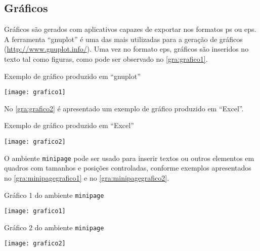 \subsection{Gráficos}\label{sec:graficos}

Gráficos são gerados com aplicativos capazes de exportar nos formatos \gls{ps} ou \gls{eps}. A ferramenta ``gnuplot'' é uma das mais utilizadas para a geração de gráficos (\url{http://www.gnuplot.info/}). Uma vez no formato \gls{eps}, gráficos são inseridos no texto tal como figuras, como pode ser observado no \autoref{gra:grafico1}.

\begin{graph}[htb]%
\caption{Exemplo de gráfico produzido em ``gnuplot''}%
\label{gra:grafico1}%
\texttt{[image: grafico1]}%
\end{graph}

No \autoref{gra:grafico2} é apresentado um exemplo de gráfico produzido em ``Excel''.

\begin{graph}[htb]%
\caption{Exemplo de gráfico produzido em ``Excel''}%
\label{gra:grafico2}%
\texttt{[image: grafico2]}%
\end{graph}

O ambiente \texttt{minipage} pode ser usado para inserir textos ou outros elementos em quadros com tamanhos e posições controladas, conforme exemplos apresentados no \autoref{gra:minipagegrafico1} e no \autoref{gra:minipagegrafico2}.

\begin{graph}[htb]%
\begin{minipage}[t]{0.395\textwidth}%
\centering%
\caption{Gráfico 1 do ambiente \texttt{minipage}}%
\label{gra:minipagegrafico1}%
\texttt{[image: grafico1]}%
\end{minipage}
\hfill
\begin{minipage}[t]{0.595\textwidth}%
\centering%
\captionsetup{width=0.95\textwidth}%
\caption{Gráfico 2 do ambiente \texttt{minipage}}%
\label{gra:minipagegrafico2}%
\texttt{[image: grafico2]}%
\end{minipage}
\label{gra:minipagegraficos}
\end{graph}

